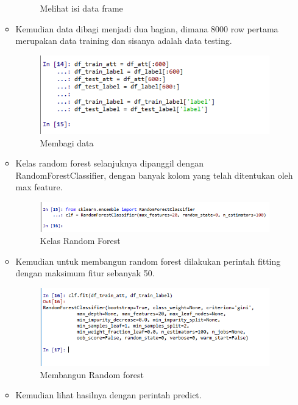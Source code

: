 \begin{enumerate}
\begin{itemize}
\begin{figure}[!hbtp]
			\caption{Melihat isi data frame}
			\label{contoh}
			\end{figure}
		\item Kemudian data dibagi menjadi dua bagian, dimana 8000 row pertama merupakan data training dan sisanya adalah data testing.
			\begin{figure}[!hbtp]
			\centering
			\includegraphics[scale=0.5]{figures/AIP/ai20.PNG}
			\caption{Membagi data}
			\label{contoh}
			\end{figure}
		\item Kelas random forest selanjuknya dipanggil dengan RandomForestClassifier, dengan banyak kolom yang telah ditentukan oleh max feature.
			\begin{figure}[!hbtp]
			\centering
			\includegraphics[scale=0.5]{figures/AIP/ai21.PNG}
			\caption{Kelas Random Forest}
			\label{contoh}
			\end{figure}
		\item Kemudian untuk membangun random forest dilakukan perintah fitting dengan maksimum fitur sebanyak 50.
			\begin{figure}[!hbtp]
			\centering
			\includegraphics[scale=0.5]{figures/AIP/ai22.PNG}
			\caption{Membangun Random forest}
			\label{contoh}
			\end{figure}
		\item Kemudian lihat hasilnya dengan perintah predict.
			\begin{figure}[!hbtp]

\end{figure}
\end{itemize}
\end{enumerate}
